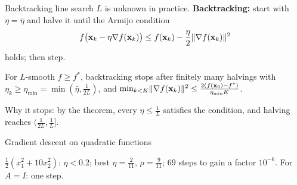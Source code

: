 \documentclass[aspectratio=1610,11pt]{beamer}
\begin{document}

\begin{frame}{Backtracking line search}
    \small
    $L$ is unknown in practice. \textbf{Backtracking:} start with $\eta = \bar\eta$ and halve it until the Armijo condition
    \[f\big(\mathbf{x}_k - \eta\nabla f(\mathbf{x}_k)\big) \leq f(\mathbf{x}_k) - \frac{\eta}{2}\lVert \nabla f(\mathbf{x}_k) \rVert^2\]
    holds; then step.
    \begin{proposition}
        \small For $L$-smooth $f \geq f^*$, backtracking stops after finitely many halvings with $\eta_k \geq \eta_{\min} = \min(\bar\eta, \frac{1}{2L})$, and $\min_{k < K}\lVert \nabla f(\mathbf{x}_k) \rVert^2 \leq \frac{2(f(\mathbf{x}_0) - f^*)}{\eta_{\min}K}$.
    \end{proposition}
    Why it stops: by the theorem, every $\eta \leq \frac{1}{L}$ satisfies the condition, and halving reaches $(\frac{1}{2L}, \frac{1}{L}]$.
\end{frame}

\begin{frame}{Gradient descent on quadratic functions}
    \begin{example}[][ex:gd-quadratic]
        \small $\frac{1}{2}(x_1^2 + 10x_2^2)$: $\eta < 0.2$; best $\eta = \frac{2}{11}$, $\rho = \frac{9}{11}$; $69$ steps to gain a factor $10^{-6}$. For $A = I$: one step.
    \end{example}
\end{frame}
\end{document}
